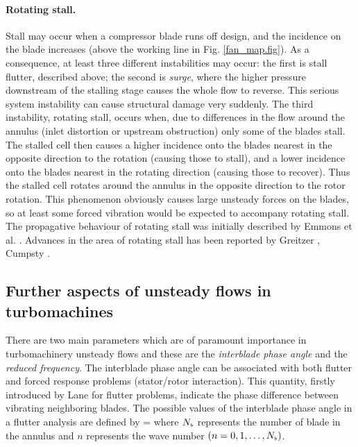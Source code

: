 \paragraph{Rotating stall.}
%
 Stall may occur when a compressor blade runs off design, and the incidence
 on the blade increases (above the working line in Fig. \ref{fan_map.fig}).
 As a consequence, at least three different instabilities may occur:
 the first is stall flutter, described above;
 the second is {\em surge}, where the higher pressure downstream of the stalling
 stage causes the whole flow to reverse. This
 serious system instability can cause structural damage very suddenly.
 The third instability, rotating stall, occurs when, due to differences
 in the flow around the annulus (inlet distortion or upstream obstruction)
 only some of the blades stall.
 The stalled cell then causes a higher incidence onto the blades nearest in the
 opposite direction to the rotation (causing those to stall),
 and a lower incidence onto the blades nearest in the rotating direction
 (causing those to recover).
 Thus the stalled cell rotates around the annulus in the opposite
 direction to the rotor rotation.
 This phenomenon obviously causes large unsteady forces on the blades, so at least
 some forced vibration would be expected to accompany rotating stall.
 The propagative behaviour of rotating stall was initially described by
 Emmons et al. \citeyear{Emmons:1}.
 Advances in the area of rotating stall has been reported by
 Greitzer \citeyear{Greitzer:1,Greitzer:2}, Cumpsty \citeyear{Cumpsty:1}.
%
%
%
%
\subsection{Further aspects of unsteady flows in turbomachines}
%
 There are two main parameters which are of paramount importance in
 turbomachinery unsteady flows and these are the {\em interblade phase angle}
 and the {\em reduced frequency}.
 The interblade phase angle can be associated with both flutter and forced  response problems (stator/rotor interaction). This quantity, firstly
 introduced by Lane \citeyear{Lane:1} for flutter problems,
 indicate the phase difference between vibrating neighboring blades.
 The possible values of the interblade phase angle in a flutter analysis are
 defined by
%
\beq
  \phi = 
  \label{ibps_flutter}
\eeq
%
 where $N_{\mbox{\tiny $b$}}$ represents the number of blade in the annulus and $n$ represents
 the wave number $\left(n = 0, 1, \dots, N_{\mbox{\tiny $b$}}\right)$.

